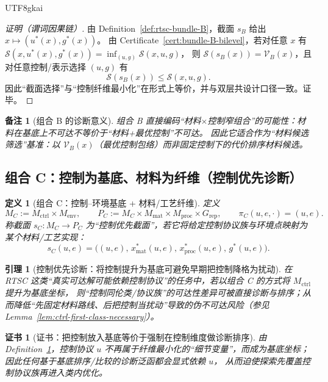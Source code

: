 \documentclass[12pt]{article}
\newtheorem{definition}{定义}[section]
\newtheorem{lemma}{引理}[section]
\newtheorem{remark}{备注}[section]
\newtheorem{certificate}{证书}[section]
\newcommand{\RTSC}{\textsf{RTSC}}
\begin{document}
\begin{CJK*}{UTF8}{gkai}
\begin{proof}[证明（谓词因果链）]
由 Definition~\ref{def:rtsc-bundle-B}，截面 $s_B$ 给出 $x\mapsto (u^\ast(x),g^\ast(x))$。
由 Certificate~\ref{cert:bundle-B-bilevel}，若对任意 $x$ 有 $\mathcal{S}(x,u^\ast(x),g^\ast(x))=\inf_{(u,g)}\mathcal{S}(x,u,g)$，
  则 $\mathcal{S}(s_B(x))=\mathcal{V}_B(x)$，且对任意控制/表示选择 $(u,g)$ 有
\[
\mathcal{S}(s_B(x))\le \mathcal{S}(x,u,g).
\]
因此“截面选择”与“控制纤维最小化”在形式上等价，并与双层共设计口径一致。证毕。
\end{proof}

\begin{remark}[组合 B 的诊断意义]
组合 B 直接编码“材料$\times$控制窄组合”的可能性：材料在基底上不可达不等价于“材料+最优控制”不可达。
因此它适合作为“材料候选筛选”基准：以 $\mathcal{V}_B(x)$（最优控制包络）而非固定控制下的代价排序材料候选。
\end{remark}

\subsection{组合 C：控制为基底、材料为纤维（控制优先诊断）}

\begin{definition}[组合 C：控制--环境基底 + 材料/工艺纤维]
\label{def:rtsc-bundle-C}
定义
\[
M_C:=M_{\mathrm{ctrl}}\times M_{\mathrm{env}},
\qquad
P_C:=M_C\times M_{\mathrm{mat}}\times M_{\mathrm{proc}}\times G_{\mathrm{rep}},
\qquad
\pi_C(u,e,\cdot)= (u,e).
\]
称截面 $s_C:M_C\to P_C$ 为“控制优先截面”，若它将给定控制协议族与环境点映射为某个材料/工艺实现：
\[
s_C(u,e)=\bigl((u,e),\,x_{\mathrm{mat}}^\ast(u,e),\,x_{\mathrm{proc}}^\ast(u,e),\,g^\ast(u,e)\bigr).
\]
\end{definition}

\begin{lemma}[控制优先诊断：将控制提升为基底可避免早期把控制降格为扰动]
\label{lem:ctrl-as-base-diagnosis}
在 \RTSC{} 这类“真实可达解可能依赖控制协议”的任务中，若以组合 C 的方式将 $M_{\mathrm{ctrl}}$ 提升为基底坐标，
则“控制同伦类/协议族”的可达性差异可被直接诊断与排序；从而降低“先固定材料路线、后把控制当扰动”导致的伪不可达风险（参见 Lemma~\ref{lem:ctrl-first-class-necessary}）。
\end{lemma}

\begin{certificate}[证书：把控制放入基底等价于强制在控制维度做诊断排序]
\label{cert:ctrl-as-base-diagnosis}
由 Definition~\ref{def:rtsc-bundle-C}，控制协议 $u$ 不再属于纤维最小化的“细节变量”，而成为基底坐标；因此任何基于基底排序/比较的诊断泛函都会显式依赖 $u$，
  从而迫使探索先覆盖控制协议族再进入类内优化。
\end{certificate}


\end{CJK*}
\end{document}
